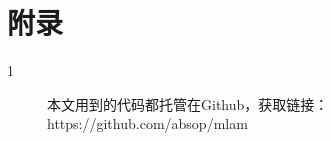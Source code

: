 \section*{附录}

\begin{description}
	\item[1] 本文用到的代码都托管在Github，获取链接：https://github.com/absop/mlam
\end{description}
